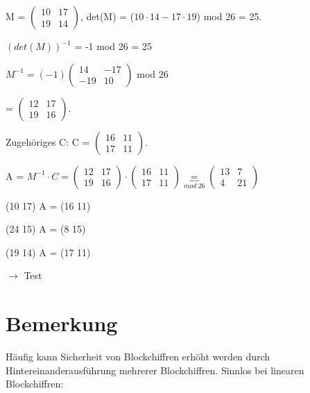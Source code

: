 M = $\begin{pmatrix}10 & 17 \\ 19 & 14 \end{pmatrix}$, det(M) = ($10 \cdot 14 - 17 \cdot 19$) mod 26 = 25.

\par \medskip

$(det(M))^{-1}$ = -1 mod 26 = 25

$M^{-1} = (-1) \begin{pmatrix}14 & - 17 \\ -19 & 10 \end{pmatrix}$ mod 26

\par \medskip

=  $\begin{pmatrix}12 & 17 \\ 19 & 16 \end{pmatrix}$.

\par \medskip

Zugehöriges C: C = $\begin{pmatrix}16 & 11 \\ 17 & 11 \end{pmatrix}$.

\par \medskip

A = $M^{-1} \cdot C = \begin{pmatrix}12 & 17 \\ 19 & 16 \end{pmatrix} \cdot \begin{pmatrix}16 & 11 \\ 17 & 11 \end{pmatrix} \underbrace{=}_{mod \ 26} \begin{pmatrix}13 & 7 \\ 4 & 21 \end{pmatrix}$

\par \medskip

(10 17) A = (16 11)

(24 15) A = (8 15)

(19 14) A = (17 11)

$\rightarrow$ Test

\section{Bemerkung}

Häufig kann Sicherheit von Blockchiffren erhöht werden durch Hintereinanderausführung mehrerer Blockchiffren. Sinnlos bei linearen Blockchiffren:

